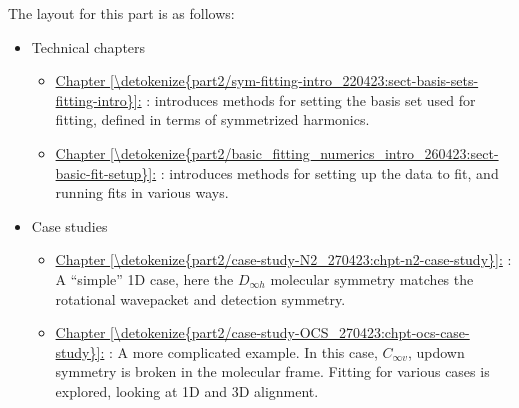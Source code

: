 \documentclass[letterpaper,table,10pt,english]{jupyterBook}
\begin{document}
\sphinxAtStartPar
The layout for this part is as follows:
\begin{itemize}
\item {} 
\sphinxAtStartPar
Technical chapters
\begin{itemize}
\item {} 
\sphinxAtStartPar
\hyperref[\detokenize{part2/sym-fitting-intro_220423:sect-basis-sets-fitting-intro}]{Chapter \ref{\detokenize{part2/sym-fitting-intro_220423:sect-basis-sets-fitting-intro}}:} {\hyperref[\detokenize{part2/sym-fitting-intro_220423:sect-basis-sets-fitting-intro}]{}}: introduces methods for setting the basis set used for fitting, defined in terms of symmetrized harmonics.

\item {} 
\sphinxAtStartPar
\hyperref[\detokenize{part2/basic_fitting_numerics_intro_260423:sect-basic-fit-setup}]{Chapter \ref{\detokenize{part2/basic_fitting_numerics_intro_260423:sect-basic-fit-setup}}:} {\hyperref[\detokenize{part2/basic_fitting_numerics_intro_260423:sect-basic-fit-setup}]{}}: introduces methods for setting up the data to fit, and running fits in various ways.

\end{itemize}

\item {} 
\sphinxAtStartPar
Case studies
\begin{itemize}
\item {} 
\sphinxAtStartPar
\hyperref[\detokenize{part2/case-study-N2_270423:chpt-n2-case-study}]{Chapter \ref{\detokenize{part2/case-study-N2_270423:chpt-n2-case-study}}:} {\hyperref[\detokenize{part2/case-study-N2_270423:chpt-n2-case-study}]{}}: A “simple” 1D case, here the \(D_{\infty h}\) molecular symmetry matches the rotational wavepacket and detection symmetry.

\item {} 
\sphinxAtStartPar
\hyperref[\detokenize{part2/case-study-OCS_270423:chpt-ocs-case-study}]{Chapter \ref{\detokenize{part2/case-study-OCS_270423:chpt-ocs-case-study}}:} {\hyperref[\detokenize{part2/case-study-OCS_270423:chpt-ocs-case-study}]{}}: A more complicated example. In this case, \(C_{\infty v}\), up\sphinxhyphen{}down symmetry is broken in the molecular frame. Fitting for various cases is explored, looking at 1D and 3D alignment.


\end{itemize}
\end{itemize}
\end{document}
